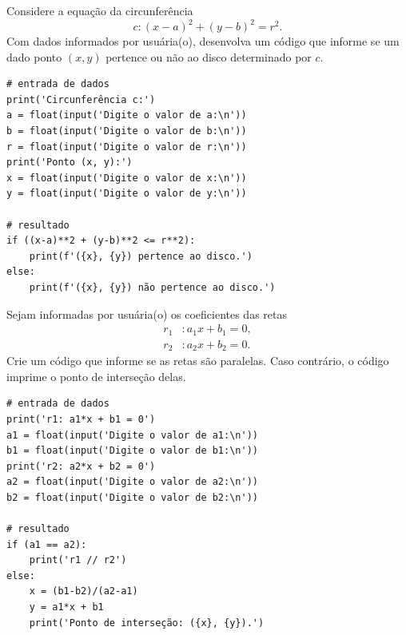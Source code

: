 \begin{exer}
  Considere a equação da circunferência
  \begin{equation}
    c: (x-a)^2 + (y-b)^2 = r^2.
  \end{equation}
  Com dados informados por usuária(o), desenvolva um código que informe se um dado ponto $(x, y)$ pertence ou não ao disco determinado por $c$.
\end{exer}
\begin{resp}

\begin{lstlisting}
# entrada de dados
print('Circunferência c:')
a = float(input('Digite o valor de a:\n'))
b = float(input('Digite o valor de b:\n'))
r = float(input('Digite o valor de r:\n'))
print('Ponto (x, y):')
x = float(input('Digite o valor de x:\n'))
y = float(input('Digite o valor de y:\n'))

# resultado
if ((x-a)**2 + (y-b)**2 <= r**2):
    print(f'({x}, {y}) pertence ao disco.')
else:
    print(f'({x}, {y}) não pertence ao disco.')
\end{lstlisting}

\end{resp}

\begin{exer}\label{cap_progest_sec_ramifica:exer:intercep_retas}
  Sejam informadas por usuária(o) os coeficientes das retas
  \begin{align}
    r_1&: a_1x + b_1 = 0,\\
    r_2&: a_2x + b_2 = 0.
  \end{align}
  Crie um código que informe se as retas são paralelas. Caso contrário, o código imprime o ponto de interseção delas.
\end{exer}
\begin{resp}

\begin{lstlisting}
# entrada de dados
print('r1: a1*x + b1 = 0')
a1 = float(input('Digite o valor de a1:\n'))
b1 = float(input('Digite o valor de b1:\n'))
print('r2: a2*x + b2 = 0')
a2 = float(input('Digite o valor de a2:\n'))
b2 = float(input('Digite o valor de b2:\n'))

# resultado
if (a1 == a2):
    print('r1 // r2')
else:
    x = (b1-b2)/(a2-a1)
    y = a1*x + b1
    print('Ponto de interseção: ({x}, {y}).')
\end{lstlisting}

\end{resp}

